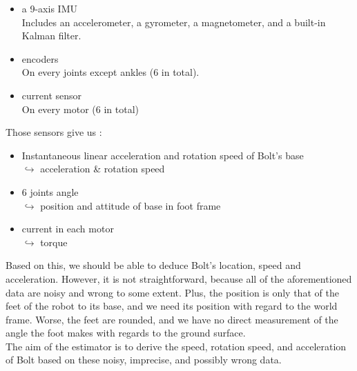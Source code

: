 \documentclass[a4paper,10pt]{article}
\begin{document}
\begin{itemize}
	\item{a 9-axis IMU \cite{IMU_datasheet}}\\
	Includes an accelerometer, a gyrometer, a magnetometer, and a built-in Kalman filter.
	\item{encoders}\\
	On every joints except ankles (6 in total).
	\item{current sensor}\\
	On every motor (6 in total)
\end{itemize}
\medskip
Those sensors give us :
\begin{itemize}
	\item{Instantaneous linear acceleration and rotation speed of Bolt's base\\
	$\hookrightarrow$ acceleration \& rotation speed}
	\item{6 joints angle\\
	$\hookrightarrow$ position and attitude of base in foot frame}
	\item{current in each motor\\
	$\hookrightarrow$ torque}
\end{itemize}

Based on this, we should be able to deduce Bolt's location, speed and acceleration. However, it is not straightforward, because all of the aforementioned data are noisy and wrong to some extent. Plus, the position is only that of the feet of the robot to its base, and we need its position with regard to the world frame. Worse, the feet are rounded, and we have no direct measurement of the angle the foot makes with regards to the ground surface.\\
The aim of the estimator is to derive the speed, rotation speed, and acceleration of Bolt based on these noisy, imprecise, and possibly wrong data.
\end{document}
